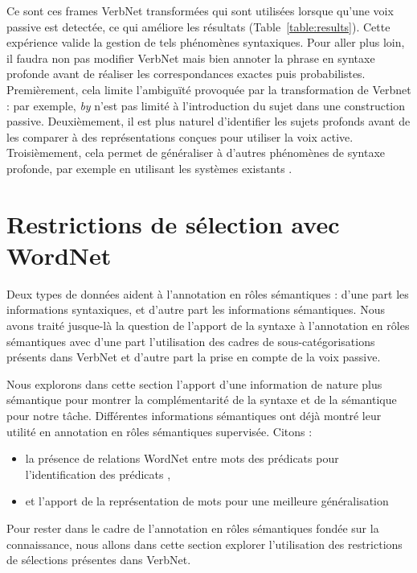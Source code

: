 Ce sont ces frames VerbNet transformées qui sont utilisées lorsque qu'une voix
passive est detectée, ce qui améliore les résultats
(Table~\ref{table:results}). Cette expérience valide la gestion de tels
phénomènes syntaxiques. Pour aller plus loin, il faudra non pas modifier
VerbNet mais bien annoter la phrase en syntaxe profonde avant de réaliser les
correspondances exactes puis probabilistes. Premièrement, cela limite
l'ambiguïté provoquée par la transformation de Verbnet : par exemple, \textit{by}
n'est pas limité à l'introduction du sujet dans une construction passive.
Deuxièmement, il est plus naturel d'identifier les sujets profonds avant de les
comparer à des représentations conçues pour utiliser la voix active.
Troisièmement, cela permet de généraliser à d'autres phénomènes de syntaxe
profonde, par exemple en utilisant les systèmes existants
\citep{bonfante2011modular,ribeyre2013systeme}.

\section{Restrictions de sélection avec WordNet}
\label{restrictions_selection}

Deux types de données aident à l'annotation en rôles sémantiques : d'une part
les informations syntaxiques, et d'autre part les informations sémantiques.
Nous avons traité jusque-là la question de l'apport de la syntaxe à
l'annotation en rôles sémantiques avec d'une part l'utilisation des cadres de
sous-catégorisations présents dans VerbNet et d'autre part la prise en compte
de la voix passive.

Nous explorons dans cette section l'apport d'une information de nature plus
sémantique pour montrer la complémentarité de la syntaxe et de la sémantique
pour notre tâche. Différentes informations sémantiques ont déjà montré leur
utilité en annotation en rôles sémantiques supervisée. Citons :

\begin{itemize}
    \item la présence de relations WordNet entre mots des prédicats pour
        l'identification des prédicats \citep{das2010probabilistic},
    \item et l'apport de la représentation de mots pour une meilleure
        généralisation \citep{lechelle2014utilisation}
\end{itemize}

Pour rester dans le cadre de l'annotation en rôles sémantiques fondée sur la
connaissance, nous allons dans cette section explorer l'utilisation des
restrictions de sélections présentes dans VerbNet.


